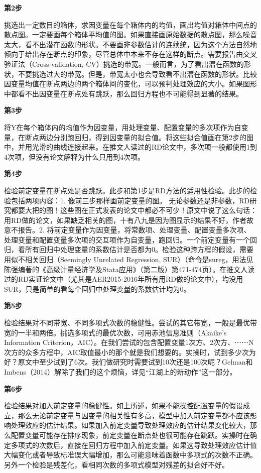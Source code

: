 \documentclass[cn,12pt,math=newtx,citestyle=gb7714-2015,bibstyle=gb7714-2015]{elegantbook}
\begin{document}
	\textbf{第2步}
	
	挑选出一定数目的箱体，求因变量在每个箱体内的均值，画出均值对箱体中间点的散点图。一定要画每个箱体平均值的图。如果直接画原始数据的散点图，那么噪音太大，看不出潜在函数的形状。不要画非参数估计的连续统，因为这个方法自然地倾向于给出存在断点的印象，尽管总体中本来不存在这样的断点。需要报告由交叉验证法（Cross-validation, CV）挑选的带宽。一般而言，为了看出潜在函数的形状，不要挑选过大的带宽。但是，带宽太小也会导致看不出潜在函数的形状。比较因变量均值在断点两边的两个箱体间的变化，可以预判处理效应的大小。如果图形中都看不出因变量在断点处有跳跃，那么回归方程也不可能得到显著的结果。
	
	\textbf{第3步}
	
	将Y在每个箱体内的均值作为因变量，用处理变量、配置变量的多次项作为自变量，在断点两边分别跑回归，得到因变量的拟合值。将这些拟合值画在第2步的图中，并用光滑的曲线连接起来。在推文人读过的RD论文中，多次项一般都使用1到4次项，但没有论文解释为什么只用到4次项。
	
	\textbf{第4步}
	
	检验前定变量在断点处是否跳跃。此步和第1步是RD方法的适用性检验。此步的检验包括两项内容：1. 像前三步那样画前定变量的图。 无论参数还是非参数，RD研究都要大把的图！这些图在正式发表的论文中都必不可少！原文中说了这么句话：用RD做的论文，如果缺乏相关的图，十有八九是因为图显示的结果不好，作者故意不报告。2. 将前定变量作为因变量，将常数项、处理变量、配置变量多次项、处理变量和配置变量多次项的交互项作为自变量，跑回归。一个前定变量有一个回归，看所有回归中处理变量的系数估计是否都为0。检验这种跨方程的假设，需要用似不相关回归（Seemingly Unrelated Regression, SUR）（命令是sureg，用法见陈强编著的《高级计量经济学及Stata应用》（第二版）第471-474页）。在推文人读过的RD实证论文中（尤其是AER2015-2016年所有用RD做的论文中），均没用SUR，只是简单的看每个回归中处理变量的系数估计均为0。
	
	\textbf{第5步}
	
	检验结果对不同带宽、不同多项式次数的稳健性。尝试的其它带宽，一般是最优带宽的一半和两倍。挑选多项式的最优次数，可用赤池信息准则（Akaike's Information Criterion，AIC）。在我们尝试的包含配置变量1次方、2次方、⋯⋯N次方的众多方程中，AIC取值最小的那个就是我们想要的。实操时，试到多少次为好？原文中至少试到了6次。我们做研究时需要试到10次还是100次呢？Gelman和Imbens（2014）解除了我们的这个烦恼，详见“江湖上的新动作”这一部分。
	
	\textbf{第6步}
	
	检验结果对加入前定变量的稳健性。如上所述，如果不能操控配置变量的假设成立，那么无论前定变量与因变量的相关性有多高，模型中加入前定变量都不应该影响处理效应的估计结果。如果加入前定变量导致处理效应的估计结果变化较大，那么配置变量可能存在排序现象，前定变量在断点处也很可能存在跳跃。实操时在确定多项式的次数后，直接在回归方程中加入前定变量。如果这导致处理效应估计值大幅变化或者导致标准误大幅增加，那么可能意味着函数中多项式的次数不正确。另外一个检验是残差化，看相同次数的多项式模型对残差的拟合好不好。
	
\end{document}
